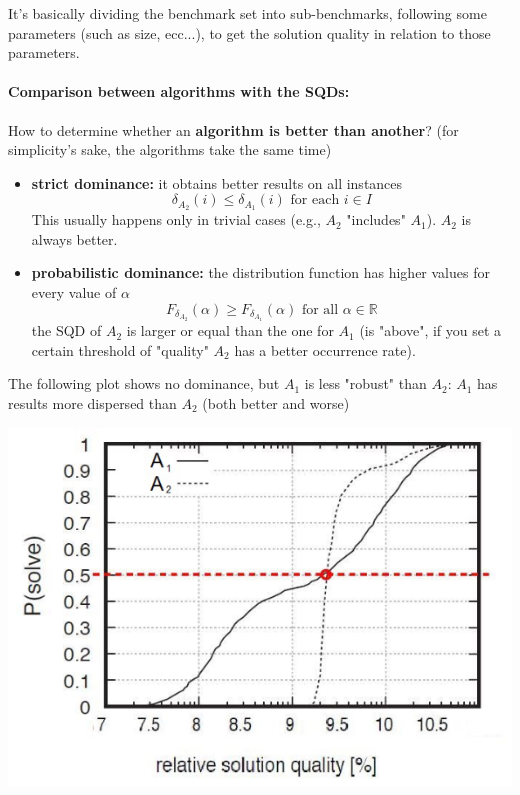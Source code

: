 It's basically dividing the benchmark set into sub-benchmarks, following some parameters (such as size, ecc...), to get the solution quality in relation to those parameters. \\

\newpage

\paragraph{Comparison between algorithms with the SQDs:} How to determine whether an \textbf{algorithm is better than another}? (for simplicity's sake, the algorithms take the same time)
\begin{itemize}
	\item \textbf{strict dominance:} it obtains better results on all instances
	$$ \delta_{A_2} (i) \leq \delta_{A_1} (i) \text{ for each } i \in I $$
	This usually happens only in trivial cases (e.g., $A_2$ "includes" $A_1$). $A_2$ is always better. \\
	
	\item \textbf{probabilistic dominance:} the distribution function has higher values for every value of $\alpha$
	$$ F_{\delta_{A_2}} (\alpha) \geq F_{\delta_{A_1}} (\alpha) \text{ for all } \alpha \in \mathbb{R} $$
	the SQD of $A_2$ is larger or equal than the one for $A_1$ (is "above", if you set a certain threshold of "quality" $A_2$ has a better occurrence rate).\\
\end{itemize}

The following plot shows no dominance, but $A_1$ is less "robust" than $A_2$: $A_1$ has results more dispersed than $A_2$ (both better and worse)
\begin{center}
	\includegraphics[width=0.7\columnwidth]{img/SQD4}
\end{center}

